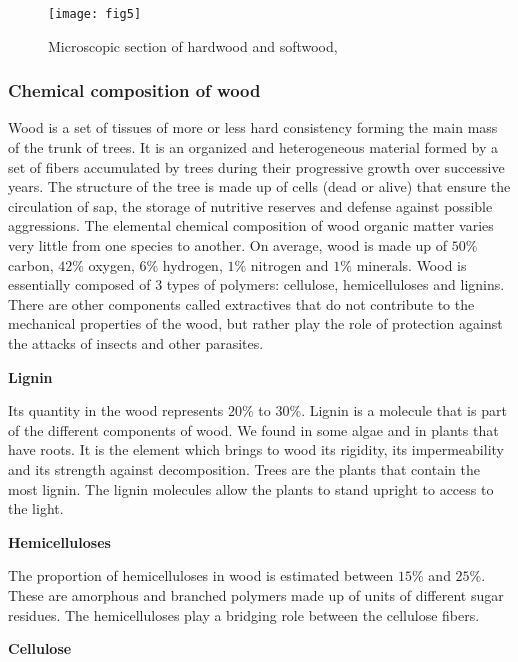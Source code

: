 \begin{figure}[htp]
	\centering
	\texttt{[image: fig5]}
	\caption{Microscopic section of hardwood and softwood, \cite{B.Thibaut}}
	\label{fig:fig5}
\end{figure}

\subsubsection{Chemical composition of wood}

Wood is a set of tissues of more or less hard consistency forming the main mass of the trunk of trees. It is an organized and heterogeneous material formed by a set of fibers accumulated by trees during their progressive growth over successive years. The structure of the tree is made up of cells (dead or alive) that ensure the circulation of sap, the storage of nutritive reserves and defense against possible aggressions.
The elemental chemical composition of wood organic matter varies very little from one species to another. On average, wood is made up of $50 \%$ carbon, $42 \%$ oxygen, $6 \%$ hydrogen, $1 \%$ nitrogen and $1 \%$ minerals. Wood is essentially composed of 3 types of polymers: cellulose, hemicelluloses and lignins. There are other components called extractives that do not contribute to the mechanical properties of the wood, but rather play the role of protection against the attacks of insects and other parasites.

\smallskip

\textbf{Lignin}

Its quantity in the wood represents $20 \%$ to $30 \%$. Lignin is a molecule that is part of the different components of wood. We found in some algae and in plants that have roots. It is the element which brings to wood its rigidity, its impermeability and its strength against decomposition. Trees are the plants that contain the most lignin. The lignin molecules allow the plants to stand upright to access to the light.

\smallskip

\textbf{Hemicelluloses}

The proportion of hemicelluloses in wood is estimated between $15 \%$ and $25 \%$. These are amorphous and branched polymers made up of units of different sugar residues. The hemicelluloses play a bridging role between the cellulose fibers.

\smallskip

\textbf{Cellulose}


